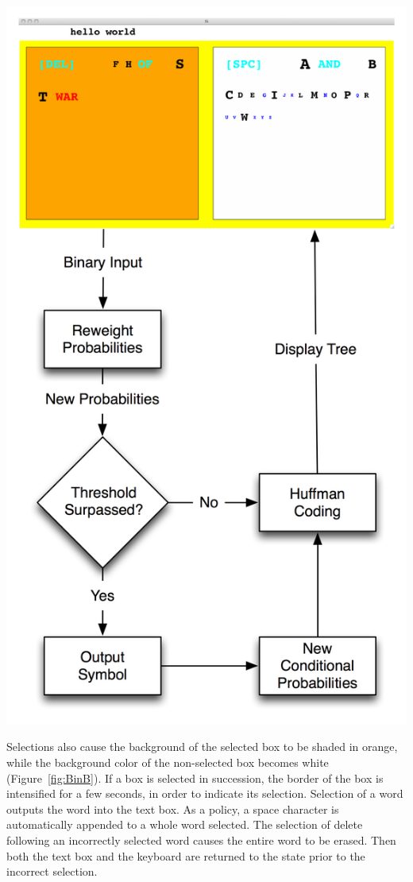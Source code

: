 \documentclass[12pt,titlepage]{article}
\begin{document}
\begin{center}
	\includegraphics[scale=0.40]{fig11.jpg}
	\label{fig:BinFlow}
\end{center}


Selections also cause the background of the selected box to be shaded in orange, while the background 
color of the non-selected box becomes white (Figure~\ref{fig:BinB}).  If a box is selected in succession, the border of the 
box is intensified for a few seconds, in order to indicate its selection.  Selection of a word outputs the 
word into the text box.  As a policy, a space character is automatically appended to a whole word 
selected.  The selection of delete following an incorrectly selected word causes the entire word to be 
erased.  Then both the text box and the keyboard are returned to the state prior to the incorrect 
selection.
\end{document}
